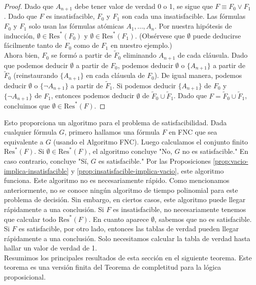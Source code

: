 \message{ !name(main.tex)}\documentclass[12pt,a4paper]{book}
\newcommand{\comillas}[1]{"#1"}
\begin{document}
\begin{proof}
        Dado que $A_{n+1}$ debe tener valor de verdad 0 o 1, se sigue que $F\equiv F_{0}\vee F_{1}$. Dado que $F$ es
        insatisfacible, $F_{0}$ y $F_{1}$ son cada una insatisfacible. Las fórmulas $F_{0}$ y $F_{1}$ solo usan las fórmulas
        atómicas $A_{1},\dots,A_{n}$. Por nuestra hipótesis de inducción, $\emptyset\in\mathrm{Res}^{*}(F_{0})$ y
        $\emptyset\in\mathrm{Res}^{*}(F_{1})$. (Obsérvese que $\emptyset$ puede deducirse fácilmente tanto de $F_{0}$ como de
        $F_{1}$ en nuestro ejemplo.)\\
        Ahora bien, $F_{0}$ se formó a partir de $\widetilde{F}_{0}$ eliminando $A_{n+1}$ de cada cláusula. Dado que podemos
        deducir $\emptyset$ a partir de $F_{0}$, podemos deducir $\emptyset$ o $\{A_{n+1}\}$ a partir de $\widetilde{F}_{0}$
        (reinstaurando $\{A_{n+1}\}$ en cada cláusula de $F_{0}$). De igual manera, podemos deducir $\emptyset$ o
        $\{\neg A_{n+1}\}$ a partir de $\widetilde{F}_{1}$. Si podemos deducir $\{A_{n+1}\}$ de $F_{0}$ y $\{\neg A_{n+1}\}$
        de $F_{1}$, entonces podemos deducir $\emptyset$ de $\widetilde{F}_{0}\cup\widetilde{F}_{1}$. Dado que
        $F=\widetilde{F}_{0}\cup\widetilde{F}_{1}$, concluimos que $\emptyset\in\mathrm{Res}^{*}(F)$.
    \end{proof}

    Esto proporciona un algoritmo para el problema de satisfacibilidad. Dada cualquier fórmula $G$, primero hallamos una
    fórmula $F$ en FNC que sea equivalente a $G$ (usando el Algoritmo FNC). Luego calculamos el conjunto finito
    $\mathrm{Res}^{*}(F)$. Si $\emptyset\in\mathrm{Res}^{*}(F)$, el algoritmo concluye \comillas{No, $G$ no es satisfacible.}
    En caso contrario, concluye \comillas{Sí, $G$ es satisfacible.} Por las Proposiciones
    \ref{prop:vacio-implica-insatisfacible} y \ref{prop:insatisfacible-implica-vacio}, este algoritmo funciona. Este
    algoritmo no es necesariamente rápido. Como mencionamos anteriormente, no se conoce ningún algoritmo de tiempo
    polinomial para este problema de decisión. Sin embargo, en ciertos casos, este algoritmo puede llegar rápidamente a una
    conclusión. Si $F$ es insatisfacible, no necesariamente tenemos que calcular todo $\mathrm{Res}^{*}(F)$. En cuanto
    aparece $\emptyset$, sabemos que no es satisfacible. Si $F$ es satisfacible, por otro lado, entonces las tablas de
    verdad pueden llegar rápidamente a una conclusión. Solo necesitamos calcular la tabla de verdad hasta hallar un valor de
    verdad de 1.\\
    Resumimos los principales resultados de esta sección en el siguiente teorema. Este teorema es una versión finita del
    Teorema de completitud para la lógica proposicional.
\end{document}
